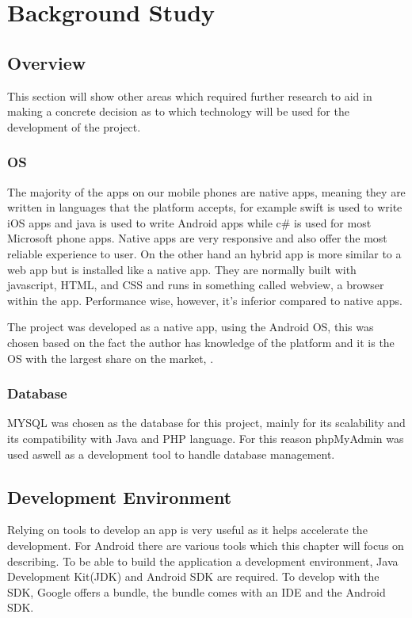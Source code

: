 \chapter{Background Study}
\label{background}
\section {Overview}
This section will show other areas which required further research to aid in making a concrete decision as to which technology will be used for the development of the project.
\subsection{OS}
The majority of the apps on our mobile phones are native apps, meaning they are written in languages that the platform accepts, for example swift is used to write iOS apps and java is used to write Android apps while c\# is used for most Microsoft phone apps.
Native apps are very responsive and also offer the most reliable experience to user. On the other hand an hybrid app is more similar to a web app but is installed like a native app. They are normally built with javascript, HTML, and CSS and runs in something called webview, a browser within the app. Performance wise, however, it's inferior compared to native apps. 

The project was developed as a native app, using the Android OS, this was chosen based on the fact the author has knowledge of the platform and it is the OS with the largest share on the market, \cite{WebHybri87:online}.

\subsection{Database}
MYSQL was chosen as the database for this project, mainly for its scalability and its compatibility with Java and PHP language. For this reason phpMyAdmin was used aswell as a development tool to handle database management.

\section{Development Environment}
Relying on tools to develop an app is very useful as it helps accelerate the development. For Android there are various tools which this chapter will focus on describing.
To be able to build the application a development environment, Java Development Kit(JDK) and Android SDK are required.
To develop with the SDK, Google offers a bundle, the bundle comes with an IDE and the  Android SDK.

